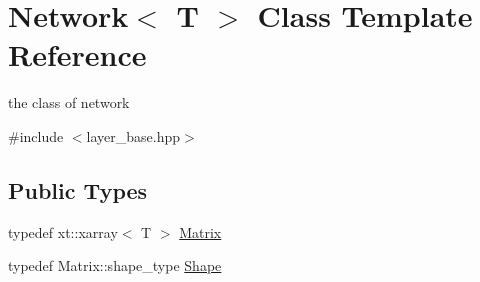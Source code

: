 \hypertarget{class_network}{}\section{Network$<$ T $>$ Class Template Reference}
\label{class_network}


the class of network  




{\ttfamily \#include $<$layer\+\_\+base.\+hpp$>$}

\subsection*{Public Types}
\begin{DoxyCompactItemize}
\item 
typedef xt\+::xarray$<$ T $>$ \mbox{\hyperlink{class_network_a3217727df6a4bde68fb686293258d7f6}{Matrix}}
\item 
typedef Matrix\+::shape\+\_\+type \mbox{\hyperlink{class_network_a581bef0355faccb9e6a4d4325792ec25}{Shape}}
\end{DoxyCompactItemize}

